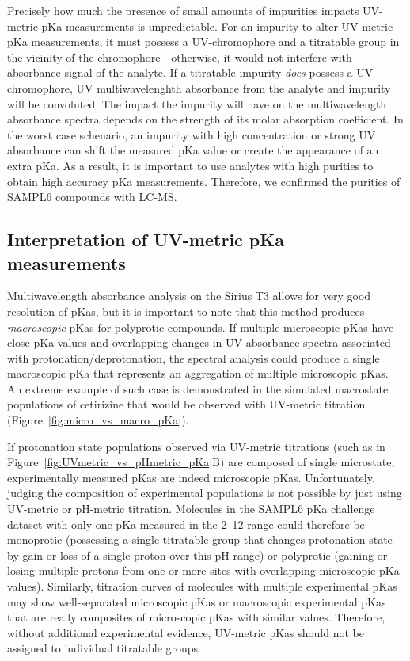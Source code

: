 \documentclass[9pt,lineno]{elife}
\begin{document}
Precisely how much the presence of small amounts of impurities impacts UV-metric pKa measurements is unpredictable. 
For an impurity to alter UV-metric pKa measurements, it must possess a UV-chromophore and a titratable group in the vicinity of the chromophore---otherwise, it would not interfere with absorbance signal of the analyte. 
If a titratable impurity \emph{does} possess a UV-chromophore, UV multiwavelenghth absorbance from the analyte and impurity will be convoluted. 
The impact the impurity will have on the multiwavelength absorbance spectra depends on the strength of its molar absorption coefficient. 
In the worst case schenario, an impurity with high concentration or strong UV absorbance can shift the measured pKa value or create the appearance of an extra pKa. As a result, it is important to use analytes with high purities to obtain high accuracy pKa measurements. 
Therefore, we confirmed the purities of SAMPL6 compounds with LC-MS.   

\subsection{Interpretation of UV-metric pKa measurements}

Multiwavelength absorbance analysis on the Sirius T3 allows for very good resolution of pKas, but it is important to note that this method produces \emph{macroscopic} pKas for polyprotic compounds. 
If multiple microscopic pKas have close pKa values and overlapping changes in UV absorbance spectra associated with protonation/deprotonation, the spectral analysis could produce a single macroscopic pKa that represents an aggregation of multiple microscopic pKas. 
An extreme example of such case is demonstrated in the simulated macrostate populations of cetirizine that would be observed with UV-metric titration (Figure~\ref{fig:micro_vs_macro_pKa}).

If protonation state populations observed via UV-metric titrations (such as in Figure~\ref{fig:UVmetric_vs_pHmetric_pKa}B) are composed of single microstate, experimentally measured pKas are indeed microscopic pKas.  
Unfortunately, judging the composition of experimental populations is not possible by just using UV-metric or pH-metric titration. 
Molecules in the SAMPL6 pKa challenge dataset with only one pKa measured in the 2--12 range could therefore be monoprotic (possessing a single titratable group that changes protonation state by gain or loss of a single proton over this pH range) or polyprotic (gaining or losing multiple protons from one or more sites with overlapping microscopic pKa values). 
Similarly, titration curves of molecules with multiple experimental pKas may show well-separated microscopic pKas or macroscopic experimental pKas that are really composites of microscopic pKas with similar values. 
Therefore, without additional experimental evidence, UV-metric pKas should not be assigned to individual titratable groups. 
\end{document}
